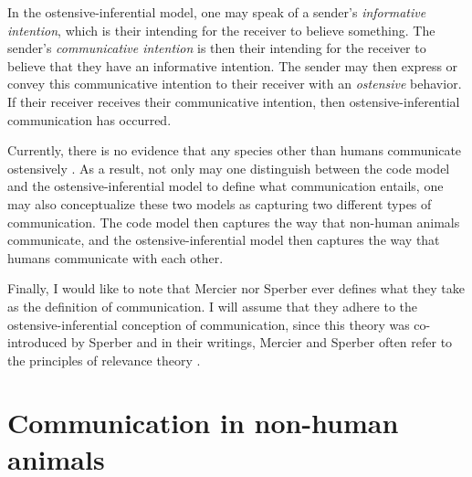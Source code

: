 In the ostensive-inferential model, one may speak of a sender's \emph{informative intention}, which is their intending for the receiver to believe something. The sender's \emph{communicative intention} is then their intending for the receiver to believe that they have an informative intention. The sender may then express or convey this communicative intention to their receiver with an \emph{ostensive} behavior. If their receiver receives their communicative intention, then ostensive-inferential communication has occurred.

Currently, there is no evidence that any species other than humans communicate ostensively \citep{Scott-Phillips18-communication}. As a result, not only may one distinguish between the code model and the ostensive-inferential model to define what communication entails, one may also conceptualize these two models as capturing two different types of communication. The code model then captures the way that non-human animals communicate, and the ostensive-inferential model then captures the way that humans communicate with each other.

Finally, I would like to note that Mercier nor Sperber ever defines what they take as the definition of communication. I will assume that they adhere to the ostensive-inferential conception of communication, since this theory was co-introduced by Sperber \citep{SperberWilson86} and in their writings, Mercier and Sperber often refer to the principles of relevance theory \citep{MS09, MS11, Sperber10}.


\section{Communication in non-human animals}
\label{sec:comm:phylogeny}

